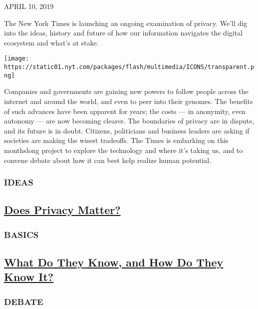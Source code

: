APRIL 10, 2019

The New York Times is launching an ongoing examination of privacy. We'll
dig into the ideas, history and future of how our information navigates
the digital ecosystem and what's at stake.

\texttt{[image: https://static01.nyt.com/packages/flash/multimedia/ICONS/transparent.png]}

Companies and governments are gaining new powers to follow people across
the internet and around the world, and even to peer into their genomes.
The benefits of such advances have been apparent for years; the costs
--- in anonymity, even autonomy --- are now becoming clearer. The
boundaries of privacy are in dispute, and its future is in doubt.
Citizens, politicians and business leaders are asking if societies are
making the wisest tradeoffs. The Times is embarking on this monthslong
project to explore the technology and where it's taking us, and to
convene debate about how it can best help realize human potential.

\hypertarget{ideas}{%
\subsubsection{IDEAS}\label{ideas}}

\hypertarget{does-privacy-matter}{%
\subsection{\texorpdfstring{\protect\hyperlink{part-one}{Does Privacy
Matter?}}{Does Privacy Matter?}}\label{does-privacy-matter}}

\hypertarget{basics}{%
\subsubsection{BASICS}\label{basics}}

\hypertarget{what-do-they-know-and-how-do-they-know-it}{%
\subsection{\texorpdfstring{\protect\hyperlink{part-two}{What Do They
Know, and How Do They Know
It?}}{What Do They Know, and How Do They Know It?}}\label{what-do-they-know-and-how-do-they-know-it}}

\hypertarget{debate}{%
\subsubsection{DEBATE}\label{debate}}

